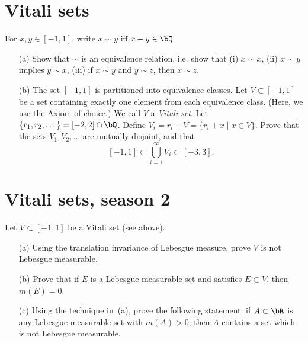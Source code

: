\documentclass[lang=cn,11pt]{elegantbook}
\begin{document}
\section{Vitali sets}
  For $x, y\in [-1,1]$, write $x\sim y$ iff $x-y\in \bQ$. 
  \begin{itemize}
  \item[(a)]
    Show that $\sim$ is an equivalence relation, i.e. show that (i) $x\sim x$, (ii) $x\sim y$ implies $y\sim x$, (iii) if $x\sim y$ and $y\sim z$, then $x\sim z$.
  \item[(b)]
    The set $[-1,1]$ is partitioned into equivalence classes. Let $V\subset[-1,1]$ be a set containing exactly one element from each equivalence class. (Here, we use the Axiom of choice.) We call $V$ a \emph{Vitali set}. 
    Let $\{r_1, r_2,\dots\} =[-2,2]\cap \bQ$. Define $V_i= r_i+V=\{r_i+x\mid x\in V\}$.
    Prove that the sets $V_1, V_2, \dots$ are mutually disjoint, and that 
    \[
      [-1, 1]\subset \bigcup_{i=1}^\infty V_i \subset [-3,3].
    \]
  \end{itemize}

\section{Vitali sets, season 2}
  Let $V\subset[-1,1]$ be a Vitali set (see above).
  \begin{itemize}
  \item[(a)]
    Using the translation invariance of Lebesgue measure, prove $V$ is not Lebesgue
    measurable.
  \item[(b)]
    Prove that if $E$ is a Lebesgue measurable set and satisfies $E\subset V$, then $m(E)=0$. 
  \item[(c)]
    Using the technique in~(a), prove the following statement: if $A\subset\bR$ is any Lebesgue measurable set with $m(A)>0$, then $A$ contains a set which is not Lebesgue measurable. 
  \end{itemize}
\end{document}
